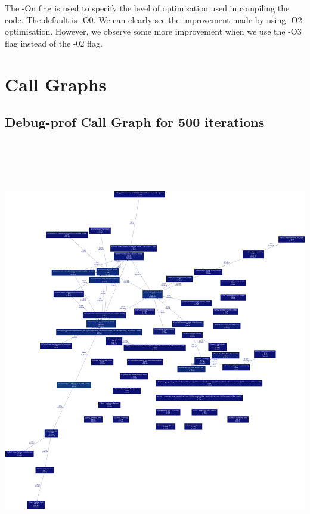 \documentclass[11pt]{article}
\begin{document}
	The -On flag is used to specify the level of optimisation used in compiling the code. The default is -O0. We can clearly see the improvement made by using -O2 optimisation. However, we observe some more improvement when we use the -O3 flag instead of the -02 flag.

\section{Call Graphs}

	\subsection{Debug-prof Call Graph for 500 iterations}

	\includegraphics[width=525pt, height=525pt]{../plots/graph_500.png}\\\\
\end{document}
